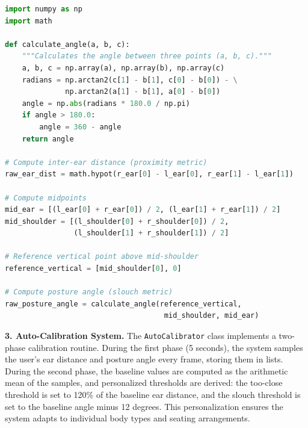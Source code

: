 \documentclass{llncs}
\begin{document}
\begin{lstlisting}[language=Python, caption={Geometric Feature Computation}, label=lst:features]
import numpy as np
import math

def calculate_angle(a, b, c):
    """Calculates the angle between three points (a, b, c)."""
    a, b, c = np.array(a), np.array(b), np.array(c)
    radians = np.arctan2(c[1] - b[1], c[0] - b[0]) - \
              np.arctan2(a[1] - b[1], a[0] - b[0])
    angle = np.abs(radians * 180.0 / np.pi)
    if angle > 180.0:
        angle = 360 - angle
    return angle

# Compute inter-ear distance (proximity metric)
raw_ear_dist = math.hypot(r_ear[0] - l_ear[0], r_ear[1] - l_ear[1])

# Compute midpoints
mid_ear = [(l_ear[0] + r_ear[0]) / 2, (l_ear[1] + r_ear[1]) / 2]
mid_shoulder = [(l_shoulder[0] + r_shoulder[0]) / 2,
                (l_shoulder[1] + r_shoulder[1]) / 2]

# Reference vertical point above mid-shoulder
reference_vertical = [mid_shoulder[0], 0]

# Compute posture angle (slouch metric)
raw_posture_angle = calculate_angle(reference_vertical,
                                     mid_shoulder, mid_ear)
\end{lstlisting}

\textbf{3. Auto-Calibration System.}
The \texttt{AutoCalibrator} class implements a two-phase calibration routine. During the first phase (5 seconds), the system samples the user's ear distance and posture angle every frame, storing them in lists. During the second phase, the baseline values are computed as the arithmetic mean of the samples, and personalized thresholds are derived: the too-close threshold is set to 120\% of the baseline ear distance, and the slouch threshold is set to the baseline angle minus 12 degrees. This personalization ensures the system adapts to individual body types and seating arrangements.
\end{document}
